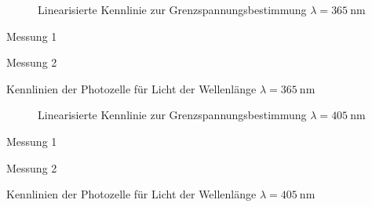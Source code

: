 \begin{figure}[h]
	\centering
	
	\caption{Linearisierte Kennlinie zur Grenzspannungsbestimmung $\lambda = \SI{365}{\nano\metre}$}
	\label{fig:kennlinien_365nm}
\end{figure}
\begin{table}[h]
	\centering
	\begin{subtable}{0.5\textwidth}
		\centering
		\vspace{0pt}
		\resizebox{0.95\columnwidth}{!}{%
			
		}
		\caption{Messung 1}
	\end{subtable}%
	\begin{subtable}{0.5\textwidth}
		\centering
		\vspace{0pt}
		\resizebox{0.95\columnwidth}{!}{%
			
		}
		\caption{Messung 2}
	\end{subtable}

	\caption{Kennlinien der Photozelle f\"ur Licht der Wellenl\"ange $\lambda=\SI{365}{\nano\metre}$}
\end{table}
\clearpage


\begin{figure}
	\centering
	
	\caption{Linearisierte Kennlinie zur Grenzspannungsbestimmung $\lambda = \SI{405}{\nano\metre}$}
	\label{fig:kennlinien_405nm}
\end{figure}
\begin{table}
	\centering
	\begin{subtable}{0.5\textwidth}
		\centering
		\vspace{0pt}
		\resizebox{0.95\columnwidth}{!}{%
			
		}
		\caption{Messung 1}
	\end{subtable}%
	\begin{subtable}{0.5\textwidth}
		\centering
		\vspace{0pt}
		\resizebox{0.95\columnwidth}{!}{%
			
		}
		\caption{Messung 2}
	\end{subtable}

	\caption{Kennlinien der Photozelle f\"ur Licht der Wellenl\"ange $\lambda = \SI{405}{\nano\metre}$}
\end{table}
\clearpage


